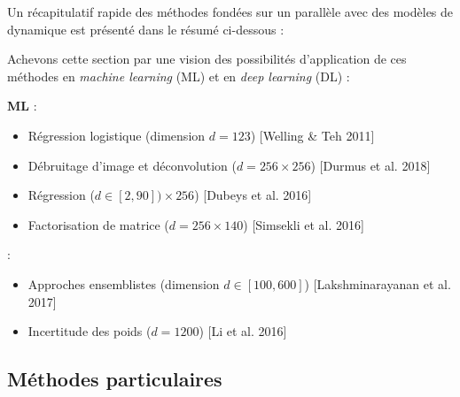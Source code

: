 Un récapitulatif rapide des méthodes fondées sur un parallèle avec des modèles de  dynamique est présenté dans le résumé ci-dessous : \\

\begin{center}
\end{center}


Achevons cette section par une vision des possibilités d'application de ces méthodes en {\it machine learning} (ML) et en {\it deep learning} (DL) : 

{\bf ML} :
\begin{itemize}
\item Régression logistique (dimension $d=123$) {\tiny [Welling \& Teh 2011]}
\item Débruitage d'image et déconvolution  ($d=256\times 256$) {\tiny [Durmus et al.  2018]}
\item Régression  ($d\in[2,90]) \times 256$) {\tiny [Dubeys et al.  2016]}
\item Factorisation de matrice ($d=256\times 140$) {\tiny [Simsekli et al.  2016]}
\end{itemize}

 :
\begin{itemize}
\item Approches ensemblistes (dimension $d\in[100,600]$) {\tiny [Lakshminarayanan et al. 2017]}
\item Incertitude des poids  ($d=1200$) {\tiny [Li et al.  2016]}
\end{itemize}


\subsection{Méthodes particulaires}

